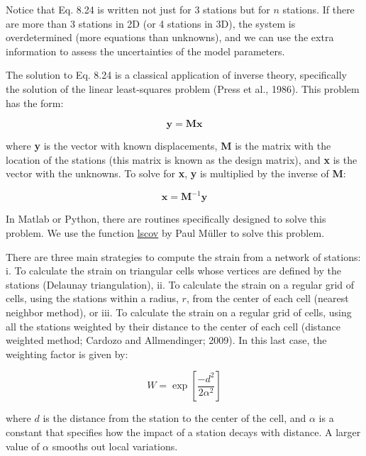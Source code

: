 \documentclass[a4paper , 12pt]{book}
\begin{document}
Notice that Eq. 8.24 is written not just for 3 stations but for $n$ stations. If there are more than 3 stations in 2D (or 4 stations in 3D), the system is overdetermined (more equations than unknowns), and we can use the extra information to assess the uncertainties of the model parameters. 

The solution to Eq. 8.24 is a classical application of inverse theory, specifically the solution of the linear least-squares problem (Press et al., 1986). This problem has the form:

\begin{equation}
    \mathbf{y}=\mathbf{M} \mathbf{x}
\end{equation}

where \textbf{y} is the vector with known displacements, \textbf{M} is the matrix with the location of the stations (this matrix is known as the design matrix), and \textbf{x} is the vector with the unknowns. To solve for \textbf{x}, \textbf{y} is multiplied by the inverse of \textbf{M}:

\begin{equation}
    \mathbf{x}=\mathbf{M}^{-1} \mathbf{y}
\end{equation}

In Matlab or Python, there are routines specifically designed to solve this problem. We use the function \href{https://github.com/nfcd/compGeo/blob/master/source/functions/lscov.py}{lscov} by Paul M\"{u}ller to solve this problem.

There are three main strategies to compute the strain from a network of stations: i. To calculate the strain on triangular cells whose vertices are defined by the stations (Delaunay triangulation), ii. To calculate the strain on a regular grid of cells, using the stations within a radius, $r$, from the center of each cell (nearest neighbor method), or iii. To calculate the strain on a regular grid of cells, using all the stations weighted by their distance to the center of each cell (distance weighted method; Cardozo and Allmendinger; 2009). In this last case, the weighting factor is given by:

\begin{equation}
    W=\exp \left[\frac{-d^{2}}{2 \alpha^{2}}\right]
\end{equation}

where $d$ is the distance from the station to the center of the cell, and $\alpha$ is a constant that specifies how the impact of a station decays with distance. A larger value of $\alpha$ smooths out local variations. 
\end{document}
